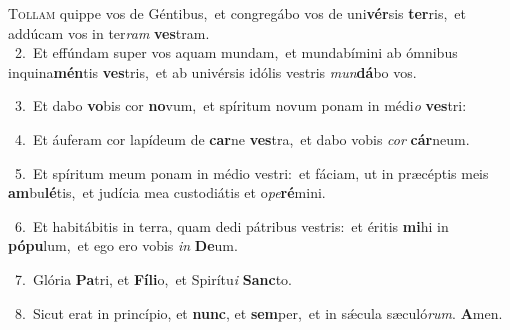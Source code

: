 \lettrine{\initial\textcolor{\initialcolor}{T}}{ollam} quippe vos de Géntibus,~\dagger et congregábo vos de uni\-\textbf{vér}\-sis \textbf{ter}\-ris,~\star et addúcam vos in ter\textit{ram} \textbf{ves}\-tram.\\
{\numbfont\textcolor{\numbcolor}{~2.}}~Et effúndam super vos aquam mundam,~\dagger et mundabímini ab ómnibus inquina\-\textbf{mén}\-tis \textbf{ves}\-tris,~\star et ab univérsis idólis vestris \textit{mun}\-\textbf{dá}bo vos.\par
{\numbfont\textcolor{\numbcolor}{~3.}}~Et dabo \textbf{vo}\-bis cor \textbf{no}\-vum,~\star et spíritum novum ponam in médi\textit{o} \textbf{ves}\-tri:\par
{\numbfont\textcolor{\numbcolor}{~4.}}~Et áuferam cor lapídeum de \textbf{car}\-ne \textbf{ves}\-tra,~\star et dabo vobis \textit{cor} \textbf{cár}\-neum.\par
{\numbfont\textcolor{\numbcolor}{~5.}}~Et spíritum meum ponam in médio vestri:~\dagger et fáciam, ut in præcéptis meis \textbf{am}\-bu\-\textbf{lé}\-tis,~\star et judícia mea custodiátis et o\-\textit{pe}\-\textbf{ré}mini.\par
{\numbfont\textcolor{\numbcolor}{~6.}}~Et habitábitis in terra, quam dedi pátribus vestris:~\dagger et éritis \textbf{mi}\-hi in \textbf{pó}\-\textbf{pu}lum,~\star et ego ero vobis \textit{in} \textbf{De}\-um.\par
{\numbfont\textcolor{\numbcolor}{~7.}}~Glória \textbf{Pa}\-tri, et \textbf{Fí}\-\textbf{li}o,~\star et Spirítu\textit{i} \textbf{Sanc}\-to.\par
{\numbfont\textcolor{\numbcolor}{~8.}}~Sicut erat in princípio, et \textbf{nunc}\-, et \textbf{sem}\-per,~\star et in sǽcula sæculó\-\textit{rum}\-. \textbf{A}\-men.\par
